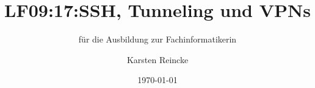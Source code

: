 \documentclass[]{beamer}
\title{LF09:17:SSH, Tunneling und VPNs}
\subtitle{für die Ausbildung zur Fachinformatikerin}
\institute[GS-LDK]{Gewerbliche Schulen Dillenburg}
\author{Karsten Reincke}
\date{\today}
\def\cfgGl{../../../cfg.gl/}
\begin{document}

\begin{frame}
  \titlepage

  
\end{frame}






\logo{}
\newpage



%
\end{document}
